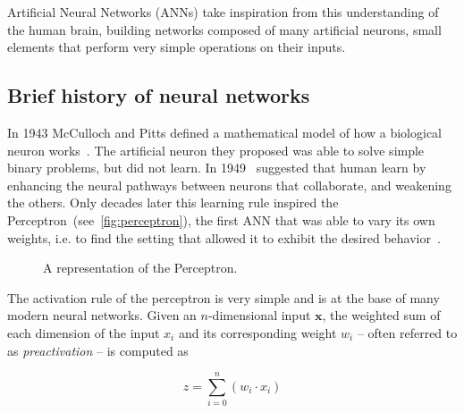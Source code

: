Artificial Neural Networks (ANNs) take inspiration from this understanding of
the human brain, building networks composed of many artificial neurons, small
elements that perform very simple operations on their inputs.

\subsection{Brief history of neural networks}
In 1943 McCulloch and Pitts defined a mathematical model of how a biological
neuron works~\citep{McCulloch43}. The artificial neuron they proposed was
able to solve simple binary problems, but did not learn. In 1949~\cite{Hebb49}
suggested that human learn by enhancing the neural pathways between neurons
that collaborate, and weakening the others. Only decades later this learning
rule inspired the Perceptron~(see~\autoref{fig:perceptron}), the first ANN that
was able to vary its own weights, i.e. to find the setting that allowed it to
exhibit the desired behavior~\citep{Rosenblatt57}.

\begin{figure}[h]
    \centering
    \begin{neuralnetwork} [nodespacing=6mm, layerspacing=23mm,
            maintitleheight=2.5em, layertitleheight=5em,
            height=3, toprow=true, nodesize=17pt,
            style={}, title={}, titlestyle={}]

        \outputlayer[count=1, text=\nodetextsigma]
        {\setdefaultlinklabel{\wilink}\linklayers}
        \redefinelayerspacing{18mm}
        \outputlayer[count=1, text=\nodetextstep]
        \linklayers
        \redefinelayerspacing{16mm}
        \outputlayer[count=1, text=\nodetexty]
        \linklayers
    \end{neuralnetwork}
    \centering
    \caption{\label{fig:perceptron}A representation of the Perceptron.}
\end{figure}

The activation rule of the perceptron is very simple and is at the base of
many modern neural networks. Given an $n$-dimensional input $\mathbf{x}$, the
weighted sum of each dimension of the input $x_i$ and its corresponding weight
$w_i$ -- often referred to as \emph{preactivation} -- is computed as

\begin{equation*}
    z = \sum_{i=0}^{n}(w_i \cdot x_i)
\end{equation*}

